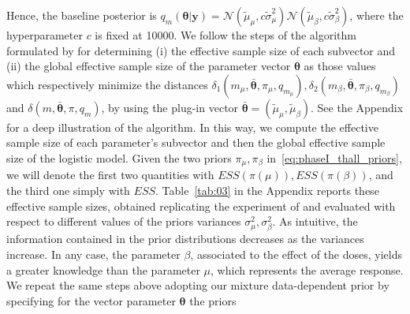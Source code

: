 \documentclass{statsoc}
\begin{document}
Hence, the baseline posterior is $q_{m}(\bm{\theta}| \bm{y}) = \mathcal{N}(\tilde{\mu}_{\mu}, c\tilde{\sigma}^{2}_{\mu})\mathcal{N}(\tilde{\mu}_{\beta}, c\tilde{\sigma}^{2}_{\beta})$, where the hyperparameter $c$ is fixed at 10000. We follow the steps of the algorithm formulated by \cite{morita2008determining} for determining (i) the effective sample size of each subvector and (ii) the global effective sample size of the parameter vector $\bm{\theta}$ as those values which respectively minimize the distances $\delta_{1}(m_{\mu},\bar{\bm{\theta}}, \pi_{\mu}, q_{m_{\mu}}), \delta_{2}(m_{\beta},\bar{\bm{\theta}}, \pi_{\beta}, q_{m_{\beta}})$ and $ \delta(m,\bar{\bm{\theta}}, \pi, q_{m})$, by using the plug-in vector $\bar{\bm{\theta}}=(\tilde{\mu}_{\mu}, \tilde{\mu}_{\beta})$. See the Appendix for a deep illustration of the algorithm. In this way, we compute the effective sample size of each parameter's subvector and then the global effective sample size of the logistic model. Given the two priors  $\pi_{\mu}, \pi_{\beta}$ in~\eqref{eq:phaseI_thall_priors}, we will denote the first two quantities with $ ESS(\pi(\mu)), ESS(\pi(\beta))$, and the third one simply with $ESS$. Table~\ref{tab:03} in the Appendix reports these effective sample sizes, obtained replicating the experiment of \cite{morita2008determining} and evaluated with respect to different values of the priors variances $\sigma^{2}_{\mu}, \sigma^{2}_{\beta}$. As intuitive, the information contained in the prior distributions decreases as the variances increase. In any case, the parameter $\beta$, associated to 
the effect of the doses, yields a greater knowledge than the parameter $\mu$, which represents the average response.
We repeat the same steps above adopting our mixture data-dependent prior by specifying for the vector parameter $\bm{\theta}$ the priors 
\end{document}
